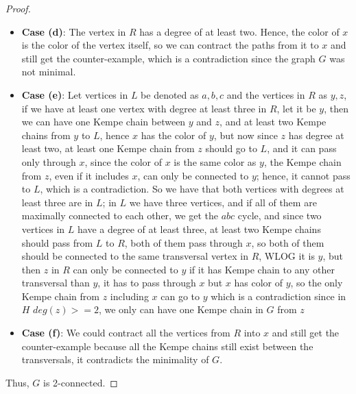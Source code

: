 \begin{proof}
\begin{itemize}
    \item \textbf{Case (d)}: 
    The vertex in $R$ has a degree of at least two. Hence, the color of $x$ is the color of the vertex itself,
so we can contract the paths from it to $x$ and still get the counter-example, which is a contradiction since the graph $G$ was not minimal.
    \item \textbf{Case (e)}:
    Let vertices in $L$ be denoted as $a,b,c$ and the vertices in $R$ as $y, z$, if we have at least one vertex with degree at least three in $R$, let it be $y$, then we can have
one Kempe chain between $y$ and $z$, and at least two Kempe chains from $y$ to $L$, hence $x$ has the color of $y$, but now since $z$ has 
degree at least two, at least one Kempe chain from $z$ should go to $L$, and it can pass only through $x$, since the color of $x$ is the same color as $y$, the 
Kempe chain from $z$, even if it includes $x$, can only be connected to $y$; hence, it cannot pass to $L$, which is a contradiction.
So we have that both vertices with degrees at least three are in $L$; in $L$ we have three vertices, and if all of them are maximally connected to each other, 
we get the $abc$ cycle, and since two vertices in $L$ have a degree of at least three, at least two Kempe chains should pass from $L$ to $R$, both of them pass through $x$, 
so both of them should be connected to the same transversal vertex in $R$, WLOG it is $y$, but then $z$ in $R$ can only be connected to $y$ if it has
Kempe chain to any other transversal than $y$, it has to pass through $x$ but $x$ has color of $y$, so the only Kempe chain from $z$ including $x$ can go to $y$
which is a contradiction since in $H$ $deg(z) >= 2$, we only can have one Kempe chain in $G$ from $z$
    \item \textbf{Case (f)}:
    We could contract all the vertices from $R$ into $x$ and still get the counter-example
    because all the Kempe chains still exist between the transversals, it contradicts the minimality of $G$.
 \end{itemize}
Thus, $G$ is 2-connected.
\end{proof}